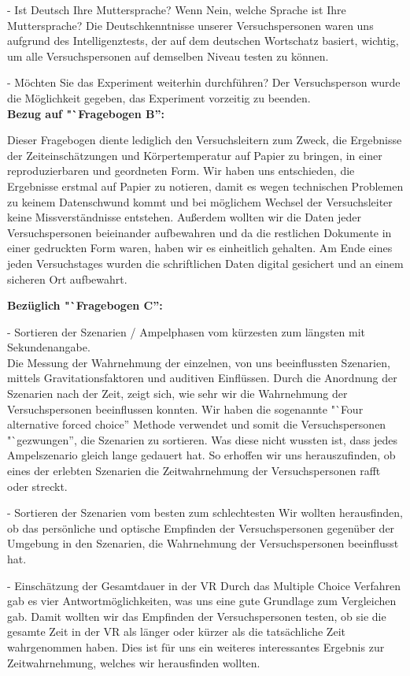 \documentclass{Bericht}
\begin{document}
- Ist Deutsch Ihre Muttersprache? Wenn Nein, welche Sprache ist Ihre Muttersprache?
Die Deutschkenntnisse unserer Versuchspersonen waren uns aufgrund des Intelligenztests, der auf dem deutschen Wortschatz basiert, wichtig, um alle Versuchspersonen auf demselben Niveau testen zu können.

- Möchten Sie das Experiment weiterhin durchführen?
Der Versuchsperson wurde die Möglichkeit gegeben, das Experiment vorzeitig zu beenden. \\

\textbf{Bezug auf "`Fragebogen B'':}

Dieser Fragebogen diente lediglich den Versuchsleitern zum Zweck, die Ergebnisse der Zeiteinschätzungen und Körpertemperatur auf Papier zu bringen, in einer reproduzierbaren und geordneten Form. Wir haben uns entschieden, die Ergebnisse erstmal auf Papier zu notieren, damit es wegen technischen Problemen zu keinem Datenschwund kommt und bei möglichem Wechsel der Versuchsleiter keine Missverständnisse entstehen. Außerdem wollten wir die Daten jeder Versuchspersonen beieinander aufbewahren und da die restlichen Dokumente in einer gedruckten Form waren, haben wir es einheitlich gehalten. Am Ende eines jeden Versuchstages wurden die schriftlichen Daten digital gesichert und an einem sicheren Ort aufbewahrt.

\textbf{Bezüglich "`Fragebogen C'':}

- Sortieren der Szenarien / Ampelphasen vom kürzesten zum längsten mit Sekundenangabe. \\
Die Messung der Wahrnehmung der einzelnen, von uns beeinflussten Szenarien, mittels Gravitationsfaktoren und auditiven Einflüssen. Durch die Anordnung der Szenarien nach der Zeit, zeigt sich, wie sehr wir die Wahrnehmung der Versuchspersonen beeinflussen konnten.  Wir haben die sogenannte "`Four alternative forced choice'' Methode verwendet und somit die Versuchspersonen "`gezwungen'', die Szenarien zu sortieren. Was diese nicht wussten ist, dass jedes Ampelszenario gleich lange gedauert hat. So erhoffen wir uns herauszufinden, ob eines der erlebten Szenarien die Zeitwahrnehmung der Versuchspersonen rafft oder streckt.

- Sortieren der Szenarien vom besten zum schlechtesten
Wir wollten herausfinden, ob das persönliche und optische Empfinden der Versuchspersonen gegenüber der Umgebung in den Szenarien, die Wahrnehmung der Versuchspersonen beeinflusst hat.

- Einschätzung der Gesamtdauer in der VR
Durch das Multiple Choice Verfahren gab es vier Antwortmöglichkeiten, was uns eine gute Grundlage zum Vergleichen gab. Damit wollten wir das Empfinden der Versuchspersonen testen, ob sie die gesamte Zeit in der VR als länger oder kürzer als die tatsächliche Zeit wahrgenommen haben. Dies ist für uns ein weiteres interessantes Ergebnis zur Zeitwahrnehmung, welches wir herausfinden wollten.
\end{document}
